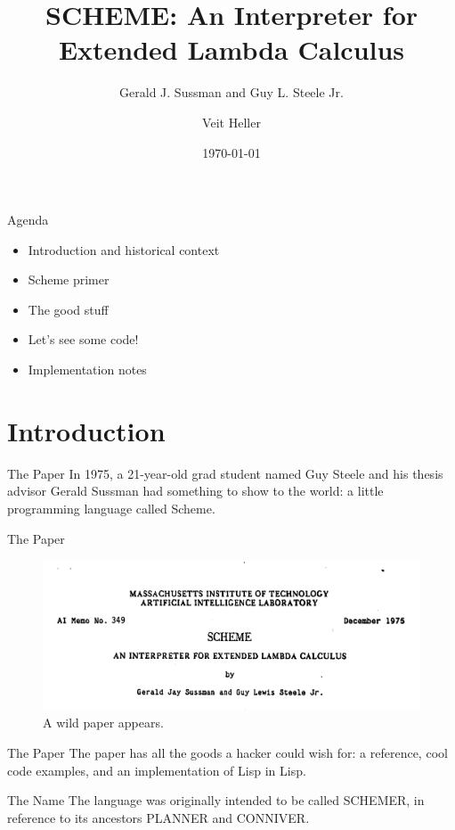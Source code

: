 \documentclass[aspectratio=169]{beamer}
\title{SCHEME: An Interpreter for Extended Lambda Calculus}
\subtitle{Gerald J. Sussman and Guy L. Steele Jr.}
\date{\today}
\author{Veit Heller}
\institute{Papers We Love Berlin}
\begin{document}
  \maketitle
  \begin{frame}{Agenda}
    \begin{itemize}
      \item Introduction and historical context
      \item Scheme primer
      \item The good stuff
      \item Let’s see some code!
      \item Implementation notes
    \end{itemize}
  \end{frame}
  \section{Introduction}
  \begin{frame}{The Paper}
    In 1975, a 21-year-old grad student named Guy Steele and his thesis
    advisor Gerald Sussman had something to show to the world: a little
    programming language called Scheme.
  \end{frame}
  \begin{frame}{The Paper}
    \begin{figure}
      \includegraphics[width=\linewidth]{header.png}
      \caption{A wild paper appears.}
    \end{figure}
  \end{frame}
  \begin{frame}{The Paper}
    The paper has all the goods a hacker could wish for: a reference, cool code
    examples, and an implementation of Lisp in Lisp.
  \end{frame}
  \begin{frame}{The Name}
    The language was originally intended to be called SCHEMER, in reference
    to its ancestors PLANNER and CONNIVER.
  \end{frame}
\end{document}
